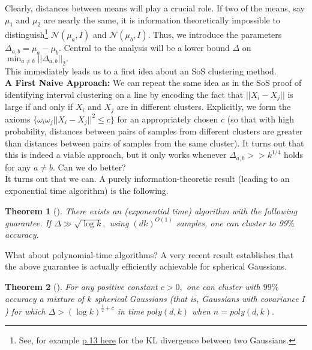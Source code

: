 \documentclass[12pt]{article}%
\newtheorem{theorem}{Theorem}
\newcommand{\normal}{\mathcal{N}}
\begin{document}
\noindent
Clearly, distances between means will play a crucial role. If two of the means, say $\mu_1$ and $\mu_2$ are nearly the same, it is information theoretically impossible to distinguish\footnote{See, for example \href{http://ai.stanford.edu/~jduchi/projects/general\_notes.pdf}{p.13 here} for the KL divergence between two Gaussians.} 
$\normal(\mu_a, I)$ and $\normal(\mu_b, I).$ Thus, we introduce the parameters 
$\Delta_{a,b} = \mu_a - \mu_b.$ Central to the analysis will be a lower bound $\Delta$ on 
$\min_{a\neq b}||\Delta_{a,b}||_2. $\\

\noindent
This immediately leads us to a first idea about an SoS clustering method.\\


\noindent
\textbf{A First Naive Approach: } We can repeat the same idea as in the SoS proof of identifying interval clustering on a line by encoding the fact that 
$||X_i - X_j||$ is large if and only if $X_i$ and $X_j$ are in different clusters. Explicitly, we form the axioms
$\{\omega_i\omega_j||X_i - X_j||^2\le c\}$ for an appropriately chosen $c$ (so that with high probability, distances between pairs of samples from different clusters are greater than distances between pairs of samples from the same cluster).
It turns out that this is indeed a viable approach, but it only works whenever $\Delta_{a,b}>>k^{1/4}$ holds for any $a\neq b.$ Can we do better?\\

\noindent
It turns out that we can. A purely information-theoretic result (leading to an exponential time algorithm) is the following.

\noindent
\begin{theorem}[\cite{expclustering}]
There exists an (exponential time) algorithm with the following guarantee.
If $\Delta \gg \sqrt{\log k},$ using $(dk)^{O(1)}$ samples, one can cluster to 99$\%$ accuracy.
\end{theorem}

\noindent
What about polynomial-time algorithms? A very recent result establishes that the above guarantee is actually efficiently achievable for spherical Gaussians.

\begin{theorem}[\cite{LiuLi}]
For any positive constant $c>0,$ one can cluster with 
$99\%$ accuracy
a mixture of $k$ spherical Gaussians (that is, Gaussians with covariance $I$) for which 
$\Delta > (\log k )^{\frac{1}{2}+c}$
in time $poly(d,k)$ when $n = poly(d,k).$ 
\end{theorem}
\end{document}
